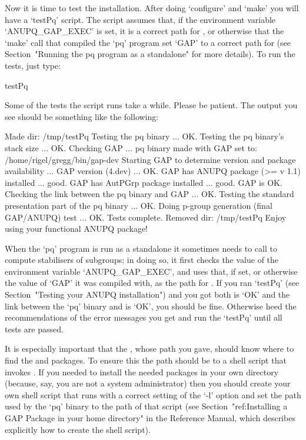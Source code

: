 
Now it is time to test the  installation.  After  doing  `configure'  and
`make' you will have a `testPq' script. The script assumes that,  if  the
environment variable `ANUPQ_GAP_EXEC' is set, it is a  correct  path  for
{\GAP}, or otherwise that the `make' call that compiled the  `pq'  program
set `GAP' to a correct path  for  {\GAP}  (see  Section~"Running  the  pq
program as a standalone" for more details). To run the tests, just type:

\begintt
testPq
\endtt

Some of the tests the script runs take a while. Please  be  patient.  The
output you see should be something like the following:

\begintt
Made dir: /tmp/testPq
Testing the pq binary ... OK.
Testing the pq binary's stack size ... OK.
Checking GAP ...
 pq binary made with GAP set to: /home/rigel/gregg/bin/gap-dev
 Starting GAP to determine version and package availability ...
  GAP version (4.dev) ... OK.
  GAP has ANUPQ package (>= v 1.1) installed ... good.
  GAP has AutPGrp package installed ... good.
 GAP is OK.
Checking the link between the pq binary and GAP ... OK.
Testing the standard presentation part of the pq binary ... OK.
Doing p-group generation (final GAP/ANUPQ) test ... OK.
Tests complete.
Removed dir: /tmp/testPq
Enjoy using your functional ANUPQ package!
\endtt


When the `pq' program is run as a standalone it sometimes  needs  to  call
{\GAP} to compute stabilisers of subgroups; in doing so, it first  checks
the value of the environment variable `ANUPQ_GAP_EXEC', and uses that, if
set, or otherwise the value of `GAP' it was compiled with,  as  the  path
for  {\GAP}.  If  you  ran  `testPq'  (see  Section~"Testing  your  ANUPQ
installation") and you got both {\GAP} is `OK' and the link  between  the
`pq' binary and {\GAP} is `OK', you should be fine.  Otherwise  heed  the
recommendations of the error messages you get and run the `testPq'  until
all tests are passed.

It is especially important that the {\GAP}, whose path you  gave,  should
know where to find the {\ANUPQ} and {\AutPGrp} packages. To  ensure  this
the path should be to a shell script that invokes {\GAP}. If  you  needed
to install the needed packages in your own directory (because,  say,  you
are not a system administrator) then you should  create  your  own  shell
script that runs {\GAP} with a correct setting of the `-l' option and set
the path used by the  `pq'  binary  to  the  path  of  that  script  (see
Section~"ref:Installing a GAP Package in  your  home  directory"  in  the
Reference Manual, which describes explicitly  how  to  create  the  shell
script).

